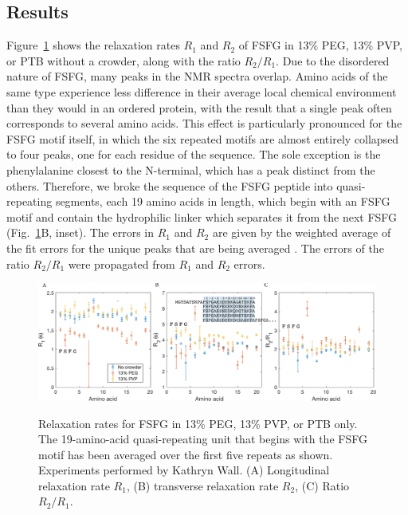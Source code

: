 \subsection{Results}

Figure~\ref{fig:NMR} shows the relaxation rates $R_1$ and $R_2$ of FSFG in 13\% PEG, 13\% PVP, or PTB without a crowder, along with the ratio $R_2/R_1$.  Due to the disordered nature of FSFG, many peaks in the NMR spectra overlap.  Amino acids of the same type experience less difference in their average local chemical environment than they would in an ordered protein, with the result that a single peak often corresponds to several amino acids.  This effect is particularly pronounced for the FSFG motif itself, in which the six repeated motifs are almost entirely collapsed to four peaks, one for each residue of the sequence.  The sole exception is the phenylalanine closest to the N-terminal, which has a peak distinct from the others.  Therefore, we broke the sequence of the FSFG peptide into quasi-repeating segments, each 19 amino acids in length, which begin with an FSFG motif and contain the hydrophilic linker which separates it from the next FSFG (Fig.~\ref{fig:NMR}B, inset).  The errors in $R_1$ and $R_2$ are given by the weighted average of the fit errors for the unique peaks that are being averaged \cite{taylor97}.  The errors of the ratio $R_2/R_1$ were propagated from $R_1$ and $R_2$ errors.

\begin{figure}
\caption[Relaxation times of FSFG in crowded conditions.]{Relaxation rates for FSFG in 13\% PEG, 13\% PVP, or PTB only.  The 19-amino-acid quasi-repeating unit that begins with the FSFG motif has been averaged over the first five repeats as shown.  Experiments performed by Kathryn Wall.  (A) Longitudinal relaxation rate $R_1$, (B) transverse relaxation rate $R_2$, (C) Ratio $R_2/R_1$.}
\centering
\includegraphics[width=\textwidth]{figs/ch05/NMR.pdf}
\label{fig:NMR}
\end{figure}

